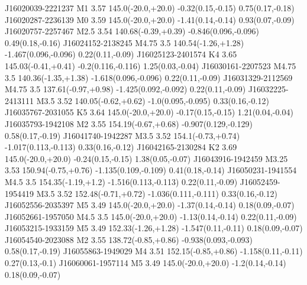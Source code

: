 J16020039-2221237  M1     3.57                   145.0(-20.0,+20.0)   -0.32(0.15,-0.15)                 0.75(0.17,-0.18)
J16020287-2236139  M0     3.59                   145.0(-20.0,+20.0)   -1.41(0.14,-0.14)                 0.93(0.07,-0.09)
J16020757-2257467  M2.5   3.54                   140.68(-0.39,+0.39)  -0.846(0.096,-0.096)              0.49(0.18,-0.16)
J16024152-2138245  M4.75  3.5                    140.54(-1.26,+1.28)  -1.467(0.096,-0.096)              0.22(0.11,-0.09)
J16025123-2401574  K4     3.65                   145.03(-0.41,+0.41)  -0.2(0.116,-0.116)                1.25(0.03,-0.04)
J16030161-2207523  M4.75  3.5                    140.36(-1.35,+1.38)  -1.618(0.096,-0.096)              0.22(0.11,-0.09)
J16031329-2112569  M4.75  3.5                    137.61(-0.97,+0.98)  -1.425(0.092,-0.092)              0.22(0.11,-0.09)
J16032225-2413111  M3.5   3.52                   140.05(-0.62,+0.62)  -1.0(0.095,-0.095)                0.33(0.16,-0.12)
J16035767-2031055  K5     3.64                   145.0(-20.0,+20.0)   -0.17(0.15,-0.15)                 1.21(0.04,-0.04)
J16035793-1942108  M2     3.55                   154.19(-0.67,+0.68)  -0.907(0.129,-0.129)              0.58(0.17,-0.19)
J16041740-1942287  M3.5   3.52                   154.1(-0.73,+0.74)   -1.017(0.113,-0.113)              0.33(0.16,-0.12)
J16042165-2130284  K2     3.69                   145.0(-20.0,+20.0)   -0.24(0.15,-0.15)                 1.38(0.05,-0.07)
J16043916-1942459  M3.25  3.53                   150.94(-0.75,+0.76)  -1.135(0.109,-0.109)              0.41(0.18,-0.14)
J16050231-1941554  M4.5   3.5                    154.35(-1.19,+1.2)   -1.516(0.113,-0.113)              0.22(0.11,-0.09)
J16052459-1954419  M3.5   3.52                   152.48(-0.71,+0.72)  -1.036(0.111,-0.111)              0.33(0.16,-0.12)
J16052556-2035397  M5     3.49                   145.0(-20.0,+20.0)   -1.37(0.14,-0.14)                 0.18(0.09,-0.07)
J16052661-1957050  M4.5   3.5                    145.0(-20.0,+20.0)   -1.13(0.14,-0.14)                 0.22(0.11,-0.09)
J16053215-1933159  M5     3.49                   152.33(-1.26,+1.28)  -1.547(0.11,-0.11)                0.18(0.09,-0.07)
J16054540-2023088  M2     3.55                   138.72(-0.85,+0.86)  -0.938(0.093,-0.093)              0.58(0.17,-0.19)
J16055863-1949029  M4     3.51                   152.15(-0.85,+0.86)  -1.158(0.11,-0.11)                0.27(0.13,-0.1)
J16060061-1957114  M5     3.49                   145.0(-20.0,+20.0)   -1.2(0.14,-0.14)                  0.18(0.09,-0.07)
